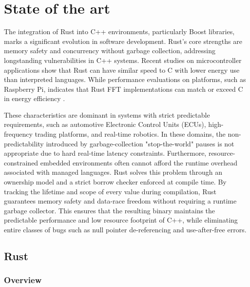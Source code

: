 
\chapter{State of the art} %

\label{chap:Chapter2} %


The integration of Rust into C++ environments, particularly Boost libraries, marks a significant evolution in software development. 
Rust's core strengths are memory safety and concurrency without garbage collection, 
addressing longstanding vulnerabilities in C++ systems. 
Recent studies on microcontroller applications show that Rust can have similar speed to C 
with lower energy use than interpreted languages. While performance evaluations on platforms, such as Raspberry Pi, 
indicates that Rust FFT implementations can match or exceed C in energy efficiency \parencite{dashdamirli2025analyzing,rooney2023evaluating}.

These characteristics are dominant in systems with strict predictable requirements, 
such as automotive Electronic Control Units (ECUs), high-frequency trading platforms, and real-time robotics. 
In these domains, the non-predictability introduced by garbage-collection "stop-the-world" pauses is not appropriate due to 
hard real-time latency constraints. Furthermore, resource-constrained embedded environments often cannot afford 
the runtime overhead associated with managed languages. Rust solves this problem through an ownership model and a 
strict borrow checker enforced at compile time. By tracking the lifetime and scope of every value during compilation, 
Rust guarantees memory safety and data-race freedom without requiring a runtime garbage collector. \parencite{okawa2024performance} 
This ensures that the resulting binary maintains the predictable performance and low resource footprint of C++, 
while eliminating entire classes of bugs such as null pointer de-referencing and use-after-free errors.

\section{Rust}

\subsection{Overview}

